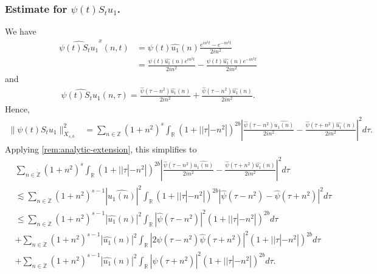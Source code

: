\documentclass[12pt,reqno]{amsart}
\numberwithin{equation}{section}  %
\numberwithin{figure}{section}
\newcommand{\rr}{\mathbb{R}}
\newcommand{\zz}{\mathbb{Z}}
\newcommand{\wh}{\widehat}
\theoremstyle{plain}
\theoremstyle{definition}
\theoremstyle{remark}
\begin{document}
\subsubsection{Estimate for $\psi(t) S_{t}u_{1}$.}
\label{sssec:estimate-init-term-2}
We have
%
%
\begin{equation*}
  \begin{split}
    \wh{\psi(t)S_{t}u_{1}}^{x}(n, t)
    & = \psi(t) \wh{u_{1}}(n) \frac{e^{in^2 t} - e^{-in^{2}t}}{2i n^{2}}
    \\
    & = \frac{\psi(t) \wh{u_{1}}(n)e^{in^{2}t}}{2i n^{2}} - \frac{\psi(t)
    \wh{u_{1}}(n)e^{-in^{2}t}}{2i n^{2}}  
  \end{split}
\end{equation*}
%
%
and
%
%
\begin{equation*}
  \begin{split}
    \wh{\psi(t) S_{t}u_{1}}(n, \tau) = \frac{\wh{\psi}(\tau -
    n^{2})\wh{u_{1}}(n)}{2i n^{2}} + \frac{\wh{\psi}(\tau - n^{2})\wh{u_{1}}(n)}{2i
    n^{2}}.
  \end{split}
\end{equation*}
%
%
Hence,
%
%
\begin{equation*}
  \begin{split}
    \| \psi(t) S_{t}u_{1} \|_{X_{s,b}}^{2} 
    & = \sum_{n \in \zz}(1 + n^{2})^{s} \int_{\rr}\left( 1 + | | \tau
    |-n^{2} | \right)^{2b} | \frac{\wh{\psi}(\tau - n^{2})\wh{u_{1}(n)}}{2i
    n^{2}} -
    \frac{\wh{\psi}(\tau + n^{2})\wh{u_{1}}(n)}{2i n^{2}} |^{2} d \tau.
    \end{split}
\end{equation*}
%
Applying \autoref{rem:analytic-extension}, this simplifies to
%
%
\begin{equation}
\begin{split}
  & \sum_{n \in \dot{\dot{\zz}}}(1 + n^{2})^{s} \int_{\rr}\left( 1 + | | \tau
    |-n^{2} | \right)^{2b} | \frac{\wh{\psi}(\tau - n^{2})\wh{u_{1}(n)}}{2i
    n^{2}} -
    \frac{\wh{\psi}(\tau + n^{2})\wh{u_{1}}(n)}{2i n^{2}} |^{2} d \tau
    \\
    & \lesssim \sum_{n \in \dot{\zz}}(1 + n^{2})^{s-1} | \wh{u_{1}(n)} |^{2} \int_{\rr}
    \left( 1 + | | \tau | - n^{2} | \right)^{2b} | \wh{\psi}(\tau - n^{2}) -
    \wh{\psi}(\tau + n^{2}) |^{2} d \tau
    \\
    & \le \sum_{n \in \dot{\zz}} \left( 1 + n^{2} \right)^{s-1} | \wh{u_{1}}(n)
    |^{2} \int_{\rr} | \wh{\psi}(\tau - n^{2}) |^{2}\left( 1 + | | \tau | -
    n^{2} | \right)^{2b} d \tau
    \\
    & + \sum_{n \in \dot{\zz}} \left( 1 + n^{2} \right)^{s-1} | \wh{u_{1}}(n)
    |^{2} \int_{\rr} | 2\wh{\psi}(\tau - n^{2})\wh{\psi}(\tau + n^{2}) |^{2}\left( 1 + | | \tau | -
    n^{2} | \right)^{2b} d \tau
    \\
    & + \sum_{n \in \dot{\zz}} \left( 1 + n^{2} \right)^{s-1} | \wh{u_{1}}(n)
    |^{2} \int_{\rr} | \wh{\psi}(\tau + n^{2}) |^{2}\left( 1 + | | \tau | -
    n^{2} | \right)^{2b} d \tau.
\end{split}
\label{u-1-norm-comp}
\end{equation}
\end{document}
